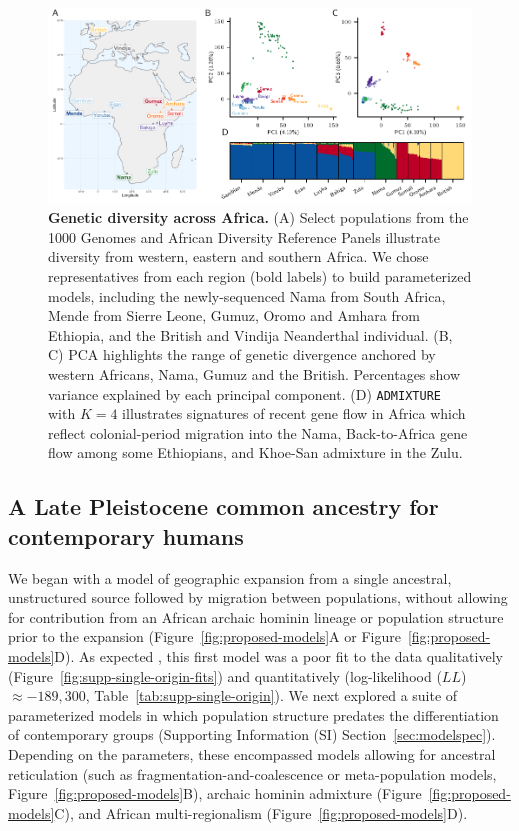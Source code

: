 \documentclass[]{article}
\begin{document}
\begin{figure}[ht!]
    \centering
    \includegraphics{figures/samples-diversity.pdf}
    \caption[width=\textwidth]{
        \textbf{Genetic diversity across Africa.}
        (A) Select populations from the 1000 Genomes and African Diversity Reference Panels
        illustrate diversity from western, eastern and southern Africa.
        We chose representatives from each region (bold labels)
        to build parameterized models,
        including the newly-sequenced Nama from South Africa, Mende
        from Sierre Leone, Gumuz, Oromo and Amhara from Ethiopia, and the
        British and Vindija Neanderthal individual.
        (B, C) PCA highlights the range of genetic divergence anchored 
        by western Africans, Nama, Gumuz and the British.
        Percentages show variance explained by each principal component.
        (D) \texttt{ADMIXTURE} with $K=4$ illustrates signatures of recent gene flow in Africa
        which reflect colonial-period migration into the Nama,
        Back-to-Africa gene flow among some Ethiopians, and Khoe-San admixture in the Zulu.
    }
    \label{fig:diversity}
\end{figure}
   
\subsection*{A Late Pleistocene common ancestry for contemporary humans}

We began with a model of geographic expansion from a single ancestral,
unstructured source followed by migration between populations, without allowing
for contribution from an African archaic hominin lineage or population
structure prior to the expansion (Figure~\ref{fig:proposed-models}A or
Figure~\ref{fig:proposed-models}D). As expected \citep{Ragsdale2019-nt}, this
first model was a poor fit to the data qualitatively
(Figure~\ref{fig:supp-single-origin-fits}) and quantitatively (log-likelihood
($LL$) $\approx -189,300$, Table~\ref{tab:supp-single-origin}).  We next
explored a suite of parameterized models in which population structure predates
the differentiation of contemporary groups (Supporting Information (SI)
Section~\ref{sec:modelspec}).  Depending on the parameters, these encompassed
models allowing for ancestral reticulation (such as
fragmentation-and-coalescence or meta-population models,
Figure~\ref{fig:proposed-models}B), archaic hominin admixture
(Figure~\ref{fig:proposed-models}C), and African multi-regionalism
(Figure~\ref{fig:proposed-models}D).
\end{document}
